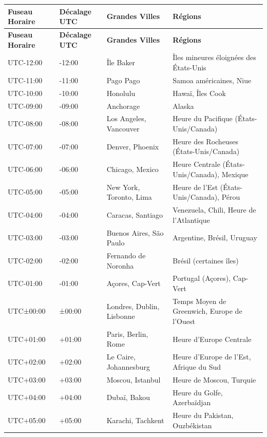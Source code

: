 \documentclass[12pt]{article}
\begin{document}
\begin{longtable}{|p{3cm}|p{2cm}|p{3cm}|p{5cm}|}
\hline
\textbf{Fuseau Horaire} & \textbf{Décalage UTC} & \textbf{Grandes Villes} & \textbf{Régions} \\
\hline
\endfirsthead
\hline
\textbf{Fuseau Horaire} & \textbf{Décalage UTC} & \textbf{Grandes Villes} & \textbf{Régions} \\
\hline
\endhead
\hline
\endfoot
\hline
\endlastfoot
UTC-12:00 & -12:00 & Île Baker & Îles mineures éloignées des États-Unis \\
\hline
UTC-11:00 & -11:00 & Pago Pago & Samoa américaines, Niue \\
\hline
UTC-10:00 & -10:00 & Honolulu & Hawaï, Îles Cook \\
\hline
UTC-09:00 & -09:00 & Anchorage & Alaska \\
\hline
UTC-08:00 & -08:00 & Los Angeles, Vancouver & Heure du Pacifique (États-Unis/Canada) \\
\hline
UTC-07:00 & -07:00 & Denver, Phoenix & Heure des Rocheuses (États-Unis/Canada) \\
\hline
UTC-06:00 & -06:00 & Chicago, Mexico & Heure Centrale (États-Unis/Canada), Mexique \\
\hline
UTC-05:00 & -05:00 & New York, Toronto, Lima & Heure de l'Est (États-Unis/Canada), Pérou \\
\hline
UTC-04:00 & -04:00 & Caracas, Santiago & Venezuela, Chili, Heure de l'Atlantique \\
\hline
UTC-03:00 & -03:00 & Buenos Aires, São Paulo & Argentine, Brésil, Uruguay \\
\hline
UTC-02:00 & -02:00 & Fernando de Noronha & Brésil (certaines îles) \\
\hline
UTC-01:00 & -01:00 & Açores, Cap-Vert & Portugal (Açores), Cap-Vert \\
\hline
UTC±00:00 & ±00:00 & Londres, Dublin, Lisbonne & Temps Moyen de Greenwich, Europe de l'Ouest \\
\hline
UTC+01:00 & +01:00 & Paris, Berlin, Rome & Heure d'Europe Centrale \\
\hline
UTC+02:00 & +02:00 & Le Caire, Johannesburg & Heure d'Europe de l'Est, Afrique du Sud \\
\hline
UTC+03:00 & +03:00 & Moscou, Istanbul & Heure de Moscou, Turquie \\
\hline
UTC+04:00 & +04:00 & Dubaï, Bakou & Heure du Golfe, Azerbaïdjan \\
\hline
UTC+05:00 & +05:00 & Karachi, Tachkent & Heure du Pakistan, Ouzbékistan \\

\end{longtable}
\end{document}
